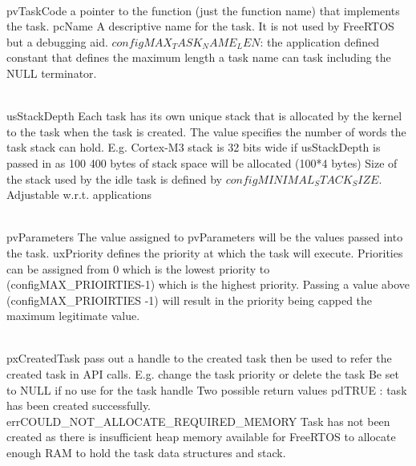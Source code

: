 \begin{description}
\os{\newpage}



\item[{\rot\bf All parameters}]~\\[-3ex]
\bi
\ite pvTaskCode
\bi
\ite a pointer to the function (just the function name) that implements the task.
\ei
\ite pcName
\bi
\ite A descriptive name for the task. It is not used by FreeRTOS but a debugging aid.
\ite $configMAX_TASK_NAME_LEN$: the application defined constant that defines the maximum length a task name can task including the NULL terminator.
\ei
\ei

\os{\newpage}



\item[{\rot\bf All parameters}]~\\[-3ex]
\bi
\ite usStackDepth
\bi
\ite Each task has its own unique stack that is allocated by the kernel to the task when the task is created.
\ite The value specifies the number of words the task stack can hold.
\bi
\ite E.g. Cortex-M3 stack is 32 bits wide if usStackDepth is passed in as 100 400 bytes of stack space will be allocated (100*4 bytes)
\ei
\ite Size of the stack used by the idle task is defined by $configMINIMAL_STACK_SIZE$.
\bi
\ite Adjustable w.r.t. applications
\ei
\ei
\ei

\os{\newpage}



\item[{\rot\bf All parameters}]~\\[-3ex]
\bi
\ite pvParameters
\bi
\ite The value assigned to pvParameters will be the values passed into the task.
\ei
\ite uxPriority
\bi
\ite defines the priority at which the task will execute.
\ite Priorities can be assigned from 0 which is the lowest priority to (configMAX_PRIOIRTIES-1) which is the highest priority.
\ite Passing a value above (configMAX_PRIOIRTIES -1) will result in the priority being capped the maximum legitimate value.
\ei
\ei

\os{\newpage}



\item[{\rot\bf All parameters}]~\\[-3ex]
\bi
\ite pxCreatedTask
\bi
\ite pass out a handle to the created task then be used to refer the created task in API calls.
\bi
\ite E.g. change the task priority or delete the task
\ei
\ite Be set to NULL if no use for the task handle
\ite
\ei
\ite Two possible return values
\bi
\ite pdTRUE : task has been created successfully.
\ite errCOULD_NOT_ALLOCATE_REQUIRED_MEMORY
\bi
\ite Task has not been created as there is insufficient heap memory available for FreeRTOS to allocate enough RAM to hold the task data structures and stack.
\ei
\ei
\ei


\end{description}
